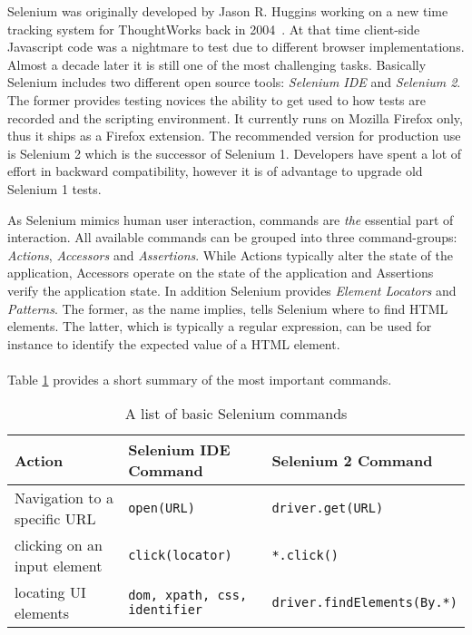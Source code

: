 \documentclass[12pt, notitlepage]{article}
\begin{document}
Selenium was originally developed by Jason R. Huggins working on a new time tracking system for ThoughtWorks back in 2004~\cite{shortcut-selenium}.
At that time client-side Javascript code was a nightmare to test due to different browser implementations. Almost a decade later it is still one of 
the most challenging tasks. Basically Selenium includes two different open source tools: \textit{Selenium IDE} and \textit{Selenium 2}. 
The former provides testing novices the ability to get used to how tests are recorded and the scripting environment. It currently runs on Mozilla Firefox only, thus it
ships as a Firefox extension. The recommended version for production use is Selenium 2 which is the successor of Selenium 1. Developers have spent a lot of effort in backward compatibility, however it is of advantage to upgrade old Selenium 1 tests. 

As Selenium mimics human user interaction, commands are \textit{the} essential part of interaction. All available commands can be
grouped into three command-groups: \textit{Actions}, \textit{Accessors} and \textit{Assertions}. While Actions typically alter the state of the application, Accessors operate on the state of the application and Assertions verify the application state. 
In addition Selenium provides \textit{Element Locators} and \textit{Patterns}. The former, as the name implies, tells Selenium where
to find HTML elements. The latter, which is typically a regular expression, can be used for instance to identify the expected value 
of a HTML element.
\\\\ 
Table \ref{tab:selenium-commands} provides a short summary of the most important commands.\\ 

\begin{table}[H]
	\begin{tabularx}{\textwidth}{l|X|X}
		\textbf{Action} & \textbf{Selenium IDE Command~\cite{ide-commands}} & \textbf{Selenium 2 Command\footnotemark~\cite{selenium2-commands}} \\
		\hline
		Navigation to a specific URL & \texttt{open(URL)} & \texttt{driver.get(URL)}\\
		clicking on an input element & \texttt{click(locator)} & \texttt{*.click()}\footnotemark\\
		locating UI elements & \texttt{dom, xpath, css, identifier}\footnotemark & \texttt{driver.findElements(By.*)}\footnotemark\\
	\end{tabularx}
	\caption{A list of basic Selenium commands}
	\label{tab:selenium-commands}
\end{table}
\end{document}
